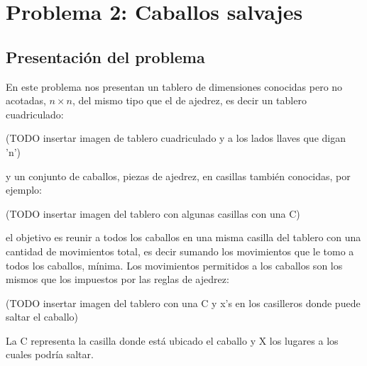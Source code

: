 \section{Problema 2: Caballos salvajes}

\subsection{Presentación del problema}
En este problema nos presentan un tablero de dimensiones conocidas pero no acotadas, $n \times n$,
del mismo tipo que el de ajedrez, es decir un tablero cuadriculado:\\
\begin{center}
(TODO insertar imagen de tablero cuadriculado y a los lados llaves que digan 'n')
\end{center}
y un conjunto de caballos, piezas de ajedrez, en casillas también conocidas, por ejemplo:\\
\begin{center}
(TODO insertar imagen del tablero con algunas casillas con una C)
\end{center}
el objetivo es reunir a todos los caballos en una misma casilla del tablero con una cantidad
de movimientos total, es decir sumando los movimientos que le tomo a todos los caballos, mínima.
Los movimientos permitidos a los caballos son los mismos que los impuestos por las reglas de ajedrez:\\
\begin{center}
(TODO insertar imagen del tablero con una C y x's en los casilleros donde puede saltar el caballo)
\end{center}
La C representa la casilla donde está ubicado el caballo y X los lugares a los cuales podría saltar.

